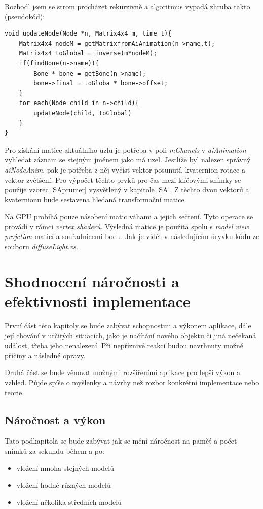 Rozhodl jsem se strom procházet rekurzivně a algoritmus vypadá zhruba takto (pseudokód):  
\lstset{frame = single, language=C++, framexleftmargin=15pt,label="Algoritmus"}

\begin{lstlisting}[caption=Algoritmus pro projití stromu uzlů]
void updateNode(Node *n, Matrix4x4 m, time t){
	Matrix4x4 nodeM = getMatrixfromAiAnimation(n->name,t);
	Matrix4x4 toGlobal = inverse(m*nodeM);
	if(findBone(n->name)){
		Bone * bone = getBone(n->name);
		bone->final = toGloba * bone->offset;
	}
	for each(Node child in n->child){
		updateNode(child, toGlobal)
	}
}
\end{lstlisting}
\vspace{10pt}
Pro získání matice aktuálního uzlu je potřeba v poli \emph{mChanels} v \emph{aiAnimation} vyhledat záznam se stejným jménem jako má uzel. Jestliže byl nalezen správný \emph{aiNodeAnim}, pak je potřeba z něj vyčíst vektor posunutí, kvaternion rotace a vektor zvětšení. Pro výpočet těchto prvků pro čas mezi klíčovými snímky se použije vzorec \ref{SAprumer} vysvětlený v kapitole \ref{SA}. Z těchto dvou vektorů a kvaternionu bude sestavena hledaná transformační matice.

Na GPU probíhá pouze násobení matic váhami a jejich sečtení. Tyto operace se provádí v rámci \emph{vertex shaderů}. Výsledná matice je použita spolu s \emph{model view projction} maticí a souřadnicemi bodu. Jak je vidět v následujícím úryvku kódu ze souboru \emph{diffuseLight.vs}.
\lstset{basicstyle=\footnotesize, frame = single, language=C++, framexleftmargin=15pt,label="Algoritmus"}
\label{SA-shader}

\chapter{Shodnocení náročnosti a efektivnosti implementace}
První část této kapitoly se bude zabývat schopnostmi a výkonem aplikace, dále její chování v určitých situacích, jako je načítání nového objektu či jiná nečekaná událost, třeba jeho nenalezení. Při nepříznivé reakci budou navrhnuty možné příčiny a následné opravy.

 Druhá část se bude věnovat možnými rozšířeními aplikace pro lepší výkon a vzhled. Půjde spíše o myšlenky a návrhy než rozbor konkrétní implementace nebo teorie. 
\section{Náročnost a výkon}
Tato podkapitola se bude zabývat jak se mění náročnost na paměť a počet snímků za sekundu během a po:
\begin{itemize}
\item vložení mnoha stejných modelů
\item vložení hodně různých modelů
\item vložení několika středních modelů	
\end{itemize}
